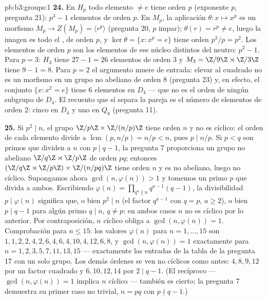 \begin{solution}{pb:b3:groups:1}
\textbf{24.} En $H_p$ todo elemento $\neq e$ tiene orden $p$ (exponente
$p$, pregunta 21): $p^3 - 1$ elementos de orden $p$. En $M_p$, la
aplicación $\theta \colon x \mapsto x^p$ es un morfismo
$M_p \to Z(M_p) = \langle r^p\rangle$ (pregunta 20, $p$ impar);
$\theta(r) = r^p \neq e$, luego la imagen es todo el
, de orden $p$, y
$\ker\theta = \{x : x^p = e\}$ tiene orden $p^3/p =
p^2$. Los elementos de orden $p$ son los elementos de ese núcleo
distintos del neutro: $p^2 - 1$. Para $p = 3$: $H_3$ tiene $27 - 1 = 26$
elementos de orden $3$ y $M_3 = \Z/9\Z \rtimes
\Z/3\Z$ tiene $9 - 1 = 8$. Para $p = 2$ el argumento muere de entrada:
elevar al cuadrado no es un morfismo en un grupo no abeliano de orden
$8$ (pregunta 23) y, en efecto, el conjunto $\{x : x^2 = e\}$ tiene $6$
elementos en $D_4$ --- que no es el orden de ningún subgrupo de $D_4$.
El recuento que sí separa la pareja es el número de elementos de orden
$2$: cinco en $D_4$ y uno en $Q_8$ (pregunta
11).

\textbf{25.} Si $p^2 \mid n$, el grupo $\Z/p\Z \times
\Z/(n/p)\Z$ tiene orden $n$ y no es cíclico: el orden de cada elemento
divide a $\operatorname{lcm}(p, n/p) = n/p < n$, pues $p \mid n/p$. Si
$p < q$ son primos que dividen a $n$ con $p \mid
q - 1$, la pregunta 7 proporciona un grupo no abeliano $\Z/q\Z \rtimes
\Z/p\Z$ de orden $pq$; entonces $(\Z/q\Z \rtimes \Z/p\Z) \times
\Z/(n/pq)\Z$ tiene orden $n$ y es no abeliano, luego no cíclico.
Supongamos ahora $\gcd(n, \varphi(n)) > 1$ y tomemos un primo $p$ que
divida a ambos. Escribiendo $\varphi(n) = \prod_{q^a \parallel
n} q^{a-1}(q - 1)$, la divisibilidad $p \mid \varphi(n)$ significa que,
o bien $p^2 \mid n$ (el factor $q^{a-1}$ con $q = p$, $a \geq 2$), o
bien $p \mid q - 1$ para algún primo $q \mid n$, $q
\neq p$: en ambos casos $n$ no es cíclico por lo anterior. Por
contraposición, $n$ cíclico obliga a $\gcd(n, \varphi(n)) = 1$.
Comprobación para $n \leq 15$: los valores $\varphi(n)$ para $n = 1,
\dots, 15$ son $1, 1, 2, 2, 4, 2, 6, 4, 6, 4, 10, 4, 12, 6,
8$, y $\gcd(n, \varphi(n)) = 1$ exactamente para $n = 1, 2, 3, 5,
7, 11, 13, 15$ --- exactamente las entradas de la tabla de la pregunta
17 con un solo grupo. Los demás órdenes se ven no cíclicos como antes:
$4, 8, 9, 12$ por un factor cuadrado y $6, 10, 12, 14$ por
$2 \mid q - 1$. (El recíproco --- $\gcd(n, \varphi(n)) = 1$ implica $n$
cíclico --- también es cierto; la pregunta 7 demuestra su primer caso no
trivial, $n = pq$ con
$p \nmid q - 1$.)
\end{solution}
